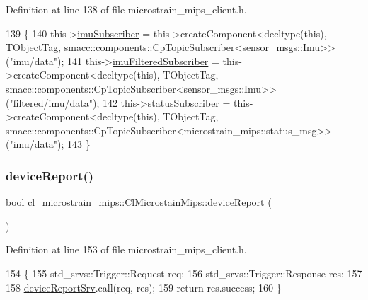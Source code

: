 Definition at line 138 of file microstrain\+\_\+mips\+\_\+client.\+h.


\begin{DoxyCode}
139     \{
140         this->\hyperlink{classcl__microstrain__mips_1_1ClMicrostainMips_a71648a9d970672d017c90bd3724b1104}{imuSubscriber} = this->createComponent<decltype(this), TObjectTag,
       smacc::components::CpTopicSubscriber<sensor\_msgs::Imu>>(\textcolor{stringliteral}{"imu/data"});
141         this->\hyperlink{classcl__microstrain__mips_1_1ClMicrostainMips_ae53fdf79a14adb9c3eff4a8966a092ff}{imuFilteredSubscriber} = this->createComponent<decltype(this),
       TObjectTag, smacc::components::CpTopicSubscriber<sensor\_msgs::Imu>>(\textcolor{stringliteral}{"filtered/imu/data"});
142         this->\hyperlink{classcl__microstrain__mips_1_1ClMicrostainMips_a0da593a071ac7ff8dd842b934120e315}{statusSubscriber} = this->createComponent<decltype(this), TObjectTag,
       smacc::components::CpTopicSubscriber<microstrain\_mips::status\_msg>>(\textcolor{stringliteral}{"imu/data"});
143     \}
\end{DoxyCode}
\mbox{\label{classcl__microstrain__mips_1_1ClMicrostainMips_a4987d87f50c6ce20102f6e3359619b88}} 
\subsubsection{\texorpdfstring{device\+Report()}{deviceReport()}}
{\footnotesize\ttfamily \hyperlink{classbool}{bool} cl\+\_\+microstrain\+\_\+mips\+::\+Cl\+Microstain\+Mips\+::device\+Report (\begin{DoxyParamCaption}{ }\end{DoxyParamCaption})\hspace{0.3cm}{\ttfamily [inline]}}



Definition at line 153 of file microstrain\+\_\+mips\+\_\+client.\+h.


\begin{DoxyCode}
154     \{
155         std\_srvs::Trigger::Request req;
156         std\_srvs::Trigger::Response res;
157 
158         \hyperlink{classcl__microstrain__mips_1_1ClMicrostainMips_a905c9403005198bb4dd62918721b7d10}{deviceReportSrv}.call(req, res);
159         \textcolor{keywordflow}{return} res.success;
160     \}
\end{DoxyCode}
\mbox{\label{classcl__microstrain__mips_1_1ClMicrostainMips_aac0a271bd226038aca61077c08c6427b}} 
